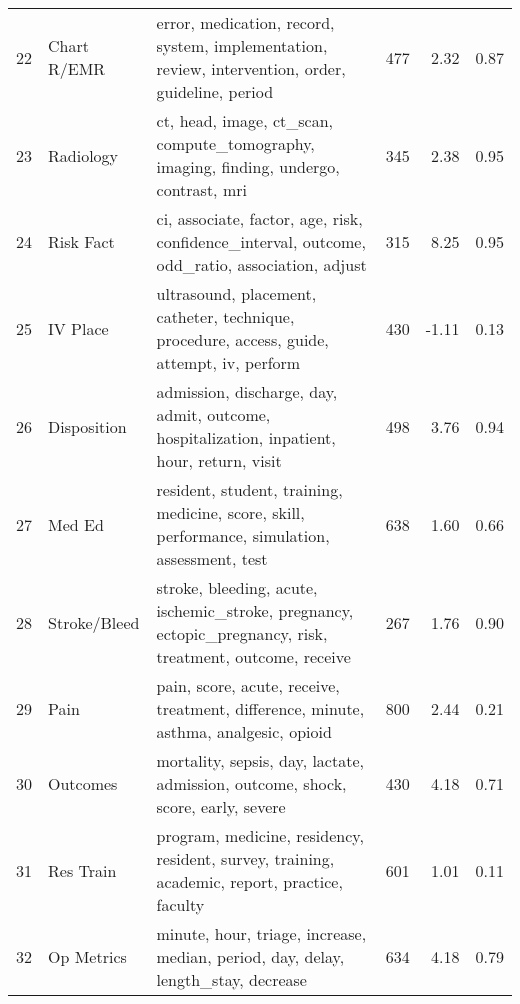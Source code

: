 \begin{tabular}{rllrrr}
    22 &   Chart R/EMR &                            error, medication, record, system, implementation, review, intervention, order, guideline, period &             477 &              2.32 &  0.87 \\
    23 &     Radiology &                                       ct, head, image, ct\_scan, compute\_tomography, imaging, finding, undergo, contrast, mri &             345 &              2.38 &  0.95 \\
    24 &     Risk Fact &                               ci, associate, factor, age, risk, confidence\_interval, outcome, odd\_ratio, association, adjust &             315 &              8.25 &  0.95 \\
    25 &      IV Place &                                   ultrasound, placement, catheter, technique, procedure, access, guide, attempt, iv, perform &             430 &             -1.11 &  0.13 \\
    26 &   Disposition &                                   admission, discharge, day, admit, outcome, hospitalization, inpatient, hour, return, visit &             498 &              3.76 &  0.94 \\
    27 &        Med Ed &                               resident, student, training, medicine, score, skill, performance, simulation, assessment, test &             638 &              1.60 &  0.66 \\
    28 &  Stroke/Bleed &                    stroke, bleeding, acute, ischemic\_stroke, pregnancy, ectopic\_pregnancy, risk, treatment, outcome, receive &             267 &              1.76 &  0.90 \\
    29 &          Pain &                                        pain, score, acute, receive, treatment, difference, minute, asthma, analgesic, opioid &             800 &              2.44 &  0.21 \\
    30 &      Outcomes &                                             mortality, sepsis, day, lactate, admission, outcome, shock, score, early, severe &             430 &              4.18 &  0.71 \\
    31 &     Res Train &                                program, medicine, residency, resident, survey, training, academic, report, practice, faculty &             601 &              1.01 &  0.11 \\
    32 &    Op Metrics &                                            minute, hour, triage, increase, median, period, day, delay, length\_stay, decrease &             634 &              4.18 &  0.79 \\

\end{tabular}
